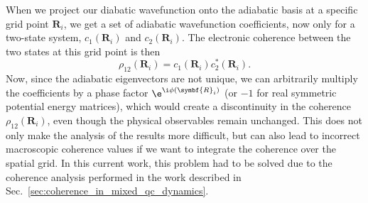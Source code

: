 When we project our diabatic wavefunction onto the adiabatic basis at a specific grid point $\symbf{R}_i$, we get a set of adiabatic wavefunction coefficients, now only for a two-state system, $c_1(\symbf{R}_i)$ and $c_2(\symbf{R}_i)$. The electronic coherence between the two states at this grid point is then
\begin{equation}
\rho_{12}(\symbf{R}_i)=c_1(\symbf{R}_i)c_2^\ast(\symbf{R}_i).
\end{equation}
Now, since the adiabatic eigenvectors are not unique, we can arbitrarily multiply the coefficients by a phase factor $\e^{\i\phi(\symbf{R}_i)}$ (or $-1$ for real symmetric potential energy matrices), which would create a discontinuity in the coherence $\rho_{12}(\symbf{R}_i)$, even though the physical observables remain unchanged. This does not only make the analysis of the results more difficult, but can also lead to incorrect macroscopic coherence values if we want to integrate the coherence over the spatial grid. In this current work, this problem had to be solved due to the coherence analysis performed in the work described in Sec.~\ref{sec:coherence_in_mixed_qc_dynamics}.

